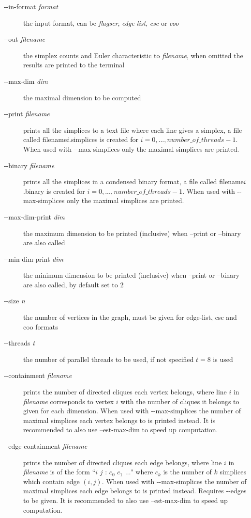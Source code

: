 \documentclass{amsart}
\theoremstyle{definition}
\begin{document}
\enlargethispage{\baselineskip}
\begin{description}
  \item [-{}-in-format \textit{format}] the input format, can be \emph{flagser}, \emph{edge-list}, \emph{csc} or \emph{coo}
  \item [-{}-out \textit{filename}] the simplex counts and Euler characteristic to \textit{filename}, when omitted the results are printed to the terminal
  \item [-{}-max-dim \textit{dim}] the maximal dimension to be computed
  \item [-{}-print \textit{filename}] prints all the simplices to a text file where each line gives a simplex, a file called filename$i$.simplices is created for $i=0,...,number\_of\_threads-1$. When used with -{}-max-simplices only the maximal simplices are printed.
  \item [-{}-binary \textit{filename}] prints all the simplices in a condensed binary format, a file called filename$i$.binary is created for $i=0,...,number\_of\_threads-1$. When used with -{}-max-simplices only the maximal simplices are printed.
  \item [-{}-max-dim-print \textit{dim}] the maximum dimension to be printed (inclusive) when --print or --binary are also called
  \item [-{}-min-dim-print \textit{dim}] the minimum dimension to be printed (inclusive) when --print or --binary are also called, by default set to 2
  \item [-{}-size \textit{n}] the number of vertices in the graph, must be given for edge-list, csc and coo formats
  \item [-{}-threads \textit{t}] the number of parallel threads to be used, if not specified $t=8$ is used
  \item [-{}-containment \textit{filename}] prints the number of directed cliques each vertex belongs, where line $i$ in \textit{filename} corresponds to vertex $i$ with the number of cliques it belongs to given for each dimension. When used with -{}-max-simplices the number of maximal simplices each vertex belongs to is printed instead. It is recommended to also use --est-max-dim to speed up computation.
  \item [-{}-edge-containment \textit{filename}] prints the number of directed cliques each edge belongs, where line $i$ in \textit{filename} is of the form ``$i$ $j$ : $c_0$ $c_1$ $\ldots$" where $c_k$ is the number of $k$ simplices which contain edge $(i,j)$. When used with -{}-max-simplices the number of maximal simplices each edge belongs to is printed instead. Requires -{}-edges to be given. It is recommended to also use --est-max-dim to speed up computation.

\end{description}
\end{document}
